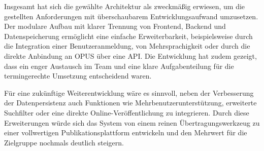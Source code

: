 Insgesamt hat sich die gewählte Architektur als zweckmäßig erwiesen, um die gestellten Anforderungen mit überschaubarem 
Entwicklungsaufwand umzusetzen. Der modulare Aufbau mit klarer Trennung von Frontend, Backend und Datenspeicherung 
ermöglicht eine einfache Erweiterbarkeit, beispielsweise durch die Integration einer Benutzeranmeldung, 
von Mehrsprachigkeit oder durch die direkte Anbindung an OPUS über eine API. Die Entwicklung hat zudem gezeigt, 
dass ein enger Austausch im Team und eine klare Aufgabenteilung für die termingerechte Umsetzung entscheidend waren.

Für eine zukünftige Weiterentwicklung wäre es sinnvoll, neben der Verbesserung der Datenpersistenz auch Funktionen 
wie Mehrbenutzerunterstützung, erweiterte Suchfilter oder eine direkte Online-Veröffentlichung zu integrieren. 
Durch diese Erweiterungen würde sich das System von einem reinen Übertragungswerkzeug zu einer vollwertigen 
Publikationsplattform entwickeln und den Mehrwert für die Zielgruppe nochmals deutlich steigern.
